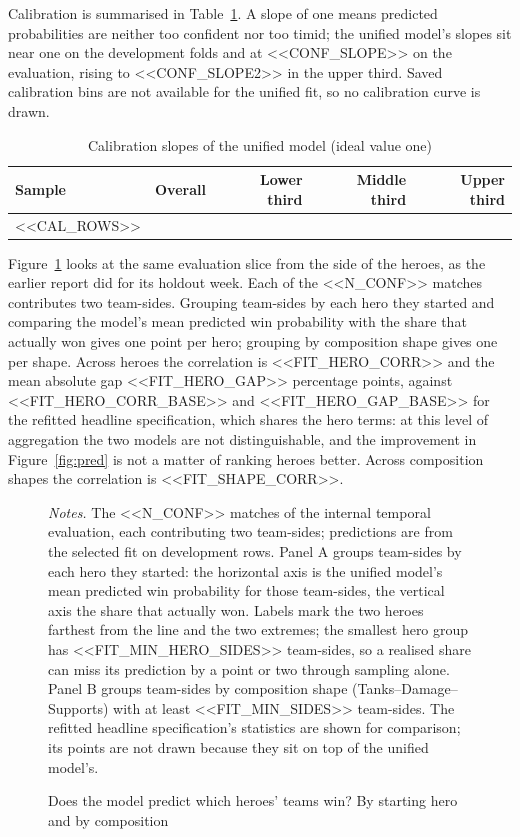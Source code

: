 \documentclass[11pt]{article}
\begin{document}
Calibration is summarised in Table~\ref{tab:cal}. A slope of one means predicted probabilities are neither
too confident nor too timid; the unified model's slopes sit near one on the development folds and at
<<CONF_SLOPE>> on the evaluation, rising to <<CONF_SLOPE2>> in the upper third. Saved calibration bins are
not available for the unified fit, so no calibration curve is drawn.

\begin{table}[H]\centering\small
\caption{Calibration slopes of the unified model (ideal value one)}\label{tab:cal}
\begin{tabular}{l r r r r}
\toprule
Sample & Overall & Lower third & Middle third & Upper third \\
\midrule
<<CAL_ROWS>>
\bottomrule
\end{tabular}
\end{table}

Figure~\ref{fig:fit} looks at the same evaluation slice from the side of the heroes, as the earlier report did
for its holdout week. Each of the <<N_CONF>> matches contributes two team-sides. Grouping team-sides by each
hero they started and comparing the model's mean predicted win probability with the share that actually won
gives one point per hero; grouping by composition shape gives one per shape. Across heroes the correlation
is <<FIT_HERO_CORR>> and the mean absolute gap <<FIT_HERO_GAP>> percentage points, against <<FIT_HERO_CORR_BASE>>
and <<FIT_HERO_GAP_BASE>> for the refitted headline specification, which shares the hero terms: at this level
of aggregation the two models are not distinguishable, and the improvement in Figure~\ref{fig:pred} is not
a matter of ranking heroes better. Across composition shapes the correlation is <<FIT_SHAPE_CORR>>.

\begin{figure}[!tb]\centering
\caption{Does the model predict which heroes' teams win? By starting hero and by composition}
\label{fig:fit}
\vspace{2pt}


\begin{minipage}{0.95\linewidth}\footnotesize\vspace{2pt}
\emph{Notes.} The <<N_CONF>> matches of the internal temporal evaluation, each contributing two team-sides;
predictions are from the selected fit on development rows. Panel A groups team-sides by each hero they started:
the horizontal axis is the unified model's mean predicted win probability for those team-sides, the vertical
axis the share that actually won. Labels mark the two heroes farthest from the line and the two extremes; the
smallest hero group has <<FIT_MIN_HERO_SIDES>> team-sides, so a realised share can miss its prediction by a
point or two through sampling alone. Panel B groups team-sides by composition shape (Tanks--Damage--Supports)
with at least <<FIT_MIN_SIDES>> team-sides. The refitted headline specification's statistics are shown for
comparison; its points are not drawn because they sit on top of the unified model's.
\end{minipage}
\end{figure}
\end{document}
